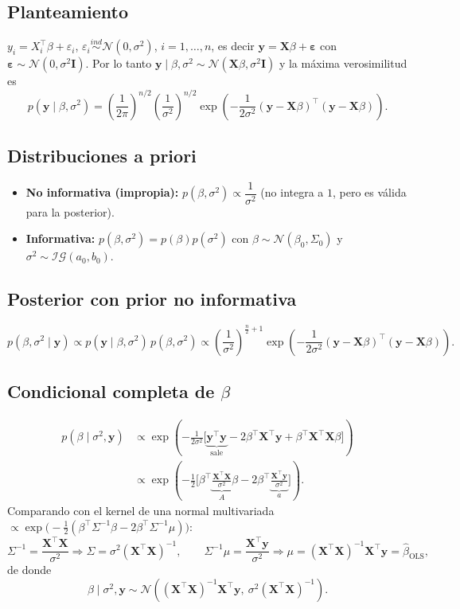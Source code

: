 \documentclass[11pt]{article}
\newcommand{\N}{\mathcal{N}}
\newcommand{\IG}{\mathcal{IG}}
\newcommand{\bX}{\mathbf{X}}
\newcommand{\by}{\mathbf{y}}
\newcommand{\bI}{\mathbf{I}}
\newcommand{\beps}{\bm{\varepsilon}}
\theoremstyle{definition}
\begin{document}
\subsection{Planteamiento}
$y_i=X_i^{\top}\beta+\varepsilon_i$, $\varepsilon_i\overset{ind}{\sim}\N(0,\sigma^2)$, $i=1,\dots,n$, es decir $\by=\bX\beta+\beps$ con $\beps\sim\N(0,\sigma^2\bI)$. Por lo tanto $\by\mid\beta,\sigma^2\sim\N(\bX\beta,\sigma^2\bI)$ y la máxima verosimilitud es
\[
p(\by\mid\beta,\sigma^2)=\left(\frac{1}{2\pi}\right)^{n/2}\left(\frac{1}{\sigma^2}\right)^{n/2}\exp\!\left(-\frac{1}{2\sigma^2}(\by-\bX\beta)^{\top}(\by-\bX\beta)\right).
\]

\subsection{Distribuciones a priori}
\begin{itemize}[leftmargin=2em]
  \item \textbf{No informativa (impropia):} $p(\beta,\sigma^2)\propto\dfrac{1}{\sigma^2}$ (no integra a $1$, pero es válida para la posterior).
  \item \textbf{Informativa:} $p(\beta,\sigma^2)=p(\beta)p(\sigma^2)$ con $\beta\sim\N(\beta_0,\Sigma_0)$ y $\sigma^2\sim\IG(a_0,b_0)$.
\end{itemize}

\subsection{Posterior con prior no informativa}
\[
p(\beta,\sigma^2\mid\by)\propto p(\by\mid\beta,\sigma^2)\,p(\beta,\sigma^2)
\propto\left(\frac{1}{\sigma^2}\right)^{\frac{n}{2}+1}\exp\!\left(-\frac{1}{2\sigma^2}(\by-\bX\beta)^{\top}(\by-\bX\beta)\right).
\]

\subsection{Condicional completa de $\beta$}
\begin{align*}
p(\beta\mid\sigma^2,\by)&\propto\exp\!\left(-\frac{1}{2\sigma^2}\big[\underbrace{\by^{\top}\by}_{\text{sale}}-2\beta^{\top}\bX^{\top}\by+\beta^{\top}\bX^{\top}\bX\beta\big]\right)\\
&\propto\exp\!\left(-\tfrac12\Big[\beta^{\top}\underbrace{\tfrac{\bX^{\top}\bX}{\sigma^2}}_{A}\beta-2\beta^{\top}\underbrace{\tfrac{\bX^{\top}\by}{\sigma^2}}_{a}\Big]\right).
\end{align*}
Comparando con el kernel de una normal multivariada $\propto\exp\!\big(-\tfrac12(\beta^{\top}\Sigma^{-1}\beta-2\beta^{\top}\Sigma^{-1}\mu)\big)$:
\[
\Sigma^{-1}=\frac{\bX^{\top}\bX}{\sigma^2}\Rightarrow\Sigma=\sigma^2(\bX^{\top}\bX)^{-1},\qquad
\Sigma^{-1}\mu=\frac{\bX^{\top}\by}{\sigma^2}\Rightarrow\mu=(\bX^{\top}\bX)^{-1}\bX^{\top}\by=\hat\beta_{\text{OLS}},
\]
de donde
\[
\beta\mid\sigma^2,\by\sim\N\!\left((\bX^{\top}\bX)^{-1}\bX^{\top}\by,\ \sigma^2(\bX^{\top}\bX)^{-1}\right).
\]
\end{document}
